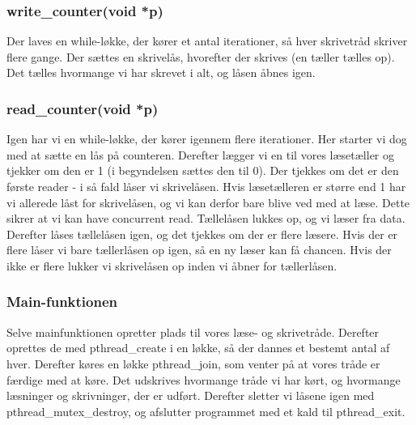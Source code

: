 \documentclass[10pt,a4paper,danish]{article}
\begin{document}
\subsubsection{write\_counter(void *p)}
Der laves en while-løkke, der kører et antal iterationer, så hver skrivetråd skriver flere gange. Der sættes en skrivelås, hvorefter der skrives (en tæller tælles op). Det tælles hvormange vi har skrevet i alt, og låsen åbnes igen.

\subsubsection{read\_counter(void *p)}
Igen har vi en while-løkke, der kører igennem flere iterationer. Her starter vi dog med at sætte en lås på counteren. Derefter lægger vi en til vores læsetæller og tjekker om den er 1 (i begyndelsen sættes den til 0). Der tjekkes om det er den første reader - i så fald låser vi skrivelåsen. Hvis læsetælleren er større end 1 har vi allerede låst for skrivelåsen, og vi kan derfor bare blive ved med at læse. Dette sikrer at vi kan have concurrent read. Tællelåsen lukkes op, og vi læser fra data. Derefter låses tællelåsen igen, og det tjekkes om der er flere læsere. Hvis der er flere låser vi bare tællerlåsen op igen, så en ny læser kan få chancen. Hvis der ikke er flere lukker vi skrivelåsen op inden vi åbner for tællerlåsen.

\subsubsection{Main-funktionen}
Selve mainfunktionen opretter plads til vores læse- og skrivetråde. Derefter oprettes de med pthread\_create i en løkke, så der dannes et bestemt antal af hver. Derefter køres en løkke pthread\_join, som venter på at vores tråde er færdige med at køre. Det udskrives hvormange tråde vi har kørt, og hvormange læsninger og skrivninger, der er udført. Derefter sletter vi låsene igen med pthread\_mutex\_destroy, og afslutter programmet med et kald til pthread\_exit.
\end{document}
